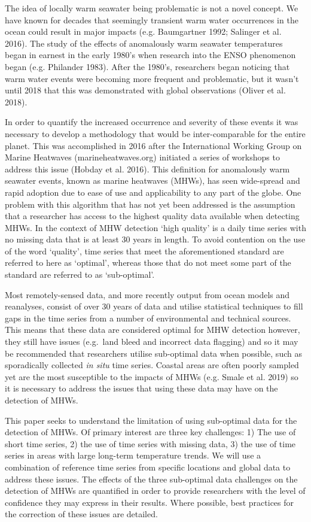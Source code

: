\documentclass[utf8]{frontiersSCNS} %
\begin{document}
The idea of locally warm seawater being problematic is not a novel
concept. We have known for decades that seemingly transient warm water
occurrences in the ocean could result in major impacts (e.g. Baumgartner
1992; Salinger et al. 2016). The study of the effects of anomalously
warm seawater temperatures began in earnest in the early 1980's when
research into the ENSO phenomenon began (e.g. Philander 1983). After the
1980's, researchers began noticing that warm water events were becoming
more frequent and problematic, but it wasn't until 2018 that this was
demonstrated with global observations (Oliver et al. 2018).

In order to quantify the increased occurrence and severity of these
events it was necessary to develop a methodology that would be
inter-comparable for the entire planet. This was accomplished in 2016
after the International Working Group on Marine Heatwaves
(marineheatwaves.org) initiated a series of workshops to address this
issue (Hobday et al. 2016). This definition for anomalously warm
seawater events, known as marine heatwaves (MHWs), has seen wide-spread
and rapid adoption due to ease of use and applicability to any part of
the globe. One problem with this algorithm that has not yet been
addressed is the assumption that a researcher has access to the highest
quality data available when detecting MHWs. In the context of MHW
detection `high quality' is a daily time series with no missing data
that is at least 30 years in length. To avoid contention on the use of
the word `quality', time series that meet the aforementioned standard
are referred to here as `optimal', whereas those that do not meet some
part of the standard are referred to as `sub-optimal'.

Most remotely-sensed data, and more recently output from ocean models
and reanalyses, consist of over 30 years of data and utilise statistical
techniques to fill gaps in the time series from a number of
environmental and technical sources. This means that these data are
considered optimal for MHW detection however, they still have issues
(e.g.~land bleed and incorrect data flagging) and so it may be
recommended that researchers utilise sub-optimal data when possible,
such as sporadically collected \emph{in situ} time series. Coastal areas
are often poorly sampled yet are the most susceptible to the impacts of
MHWs (e.g. Smale et al. 2019) so it is necessary to address the issues
that using these data may have on the detection of MHWs.

This paper seeks to understand the limitation of using sub-optimal data
for the detection of MHWs. Of primary interest are three key challenges:
1) The use of short time series, 2) the use of time series with missing
data, 3) the use of time series in areas with large long-term
temperature trends. We will use a combination of reference time series
from specific locations and global data to address these issues. The
effects of the three sub-optimal data challenges on the detection of
MHWs are quantified in order to provide researchers with the level of
confidence they may express in their results. Where possible, best
practices for the correction of these issues are detailed.
\end{document}
